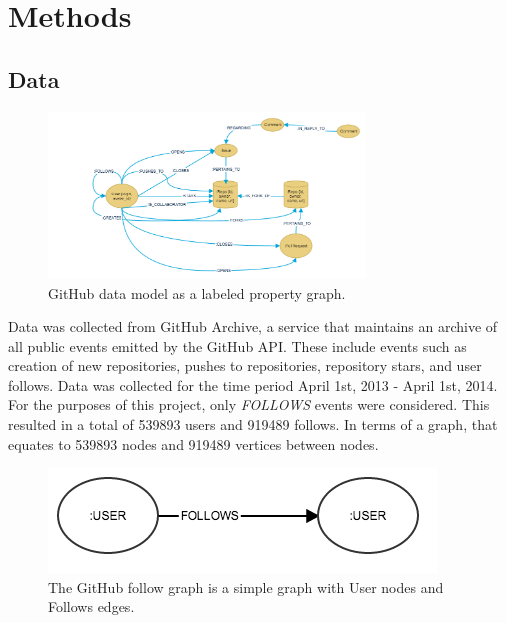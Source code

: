 
\chapter{Methods}



\section{Data}

\begin{figure}[H]
  \centering
  \includegraphics[width=0.75\textwidth]{images/githubdatamodel.png}
  \caption[GitHub graph data model]{GitHub data model as a labeled property graph.}
  \label{fig:figures:1}
\end{figure}


Data was collected from GitHub Archive\cite{githubarchive}, a service that maintains an archive of all public events emitted by the GitHub API\cite{github:Online}. These include events such as creation of new repositories, pushes to repositories, repository stars, and user follows. Data was collected for the time period April 1st, 2013 - April 1st, 2014. For the purposes of this project, only \textit{FOLLOWS} events were considered. This resulted in a total of 539893 users and 919489 follows. In terms of a graph, that equates to 539893 nodes and 919489 vertices between nodes.

\begin{figure}[ht]
\vskip 0.2in
\begin{center}
\centerline{\includegraphics[width=0.3\columnwidth]{images/user_user.png}}
\caption[User-User data model]{The GitHub follow graph is a simple graph with User nodes and Follows edges.}
\label{fig:figures:4}
\end{center}
\vskip -0.2in
\end{figure} 


